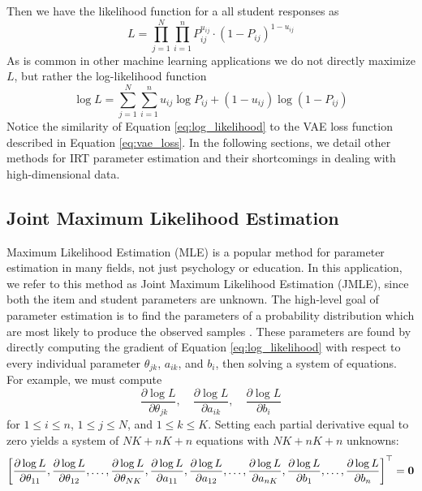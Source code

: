 Then we have the likelihood function \cite{baker_kim2004} for a all student responses as 
\begin{equation}
  L = \prod_{j=1}^N \prod_{i=1}^n P_{ij}^{u_{ij}} \cdot (1 - P_{ij})^{1- u_{ij}}
  \label{eq:likelihood}
\end{equation}
As is common in other machine learning applications we do not directly maximize $L$, but rather the log-likelihood function
\begin{equation}
  \log L = \sum_{j=1}^N \sum_{i=1}^n u_{ij} \log P_{ij} + (1-u_{ij})\log (1 - P_{ij})
  \label{eq:log_likelihood}
\end{equation}
Notice the similarity of Equation \ref{eq:log_likelihood} to the VAE loss function described in Equation \ref{eq:vae_loss}. In the following sections, we detail other methods for IRT parameter estimation and their shortcomings in dealing with high-dimensional data.


\subsection{Joint Maximum Likelihood Estimation} \label{sec:mle}
Maximum Likelihood Estimation (MLE) is a popular method for parameter estimation in many fields, not just psychology or education. In this application, we refer to this method as Joint Maximum Likelihood Estimation (JMLE), since both the item and student parameters are unknown. The high-level goal of parameter estimation is to find the parameters of a probability distribution which are most likely to produce the observed samples \cite{myung2003}. These parameters are found by directly computing the gradient of Equation \ref{eq:log_likelihood} with respect to every individual parameter $\theta_{jk}$, $a_{ik}$, and $b_i$, then solving a system of equations. For example, we must compute 
\[\frac{\partial \log L}{\partial \theta_{jk}}, \quad \frac{\partial \log L}{\partial a_{ik}}, \quad \frac{\partial \log L}{\partial b_i}\]
for $1 \leq i \leq n$, $1 \leq j \leq N$, and $1 \leq k \leq K$. Setting each partial derivative equal to zero yields a system of $NK + nK + n$ equations with $NK + nK + n$ unknowns:
\begin{equation}
  \left[ \frac{\partial \log L}{\partial \theta_{11}}, \frac{\partial \log L}{\partial \theta_{12}}, \ldots , \frac{\partial \log L}{\partial \theta_{NK}}, \frac{\partial \log L}{\partial a_{11}}, \frac{\partial \log L}{\partial a_{12}}, \ldots, \frac{\partial \log L}{\partial a_{nK}}, \frac{\partial \log L}{\partial b_1}, \ldots, \frac{\partial \log L}{\partial b_n}\right]^\top = \boldsymbol{0}
  \label{eq:solve_system}
\end{equation}

